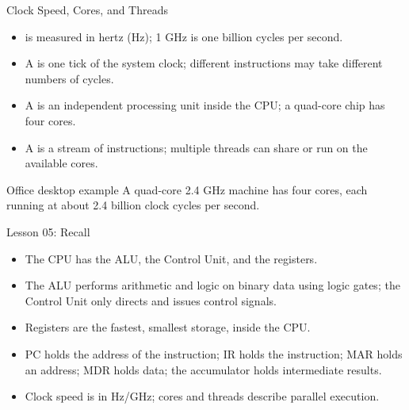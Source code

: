 \documentclass[aspectratio=169]{beamer}
\begin{document}
\begin{frame}{Clock Speed, Cores, and Threads}
  \begin{itemize}
    \item {} is measured in hertz (Hz); 1 GHz is one billion
      cycles per second.
    \item A  is one tick of the system clock; different
      instructions may take different numbers of cycles.
    \item A  is an independent processing unit inside the CPU; a
      quad-core chip has four cores.
    \item A  is a stream of instructions; multiple threads can
      share or run on the available cores.
  \end{itemize}
  \begin{block}{Office desktop example}
    A quad-core 2.4 GHz machine has four cores, each running at about 2.4
    billion clock cycles per second.
  \end{block}
\end{frame}

\begin{frame}{Lesson 05: Recall}
  \begin{itemize}
    \item The CPU has the ALU, the Control Unit, and the registers.
    \item The ALU performs arithmetic and logic on binary data using logic
      gates; the Control Unit only directs and issues control signals.
    \item Registers are the fastest, smallest storage, inside the CPU.
    \item PC holds the address of the  instruction; IR holds the
       instruction; MAR holds an address; MDR holds data; the
      accumulator holds intermediate results.
    \item Clock speed is in Hz/GHz; cores and threads describe parallel
      execution.
  \end{itemize}
\end{frame}
\end{document}
